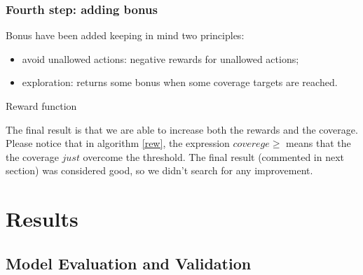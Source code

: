 \documentclass{article}
\begin{document}
\subsubsection*{Fourth step: adding bonus}
Bonus have been added keeping in mind two principles:
\begin{itemize}
\item avoid unallowed actions: negative rewards for unallowed actions;
\item exploration: returns some bonus when some coverage targets are reached.
\end{itemize}
\begin{algorithm}[H]



 \caption{Reward function}
 \label{rew}
\end{algorithm}
The final result is that we are able to increase both the rewards and the coverage. Please notice that in algorithm \ref{rew}, the expression $coverege \geq$ means that the the coverage $just$ overcome the threshold. The final result (commented in next section) was considered good, so we didn't search for any improvement.

\section{Results}
% 

\subsection{Model Evaluation and Validation}
% 
% 
% 
\end{document}
